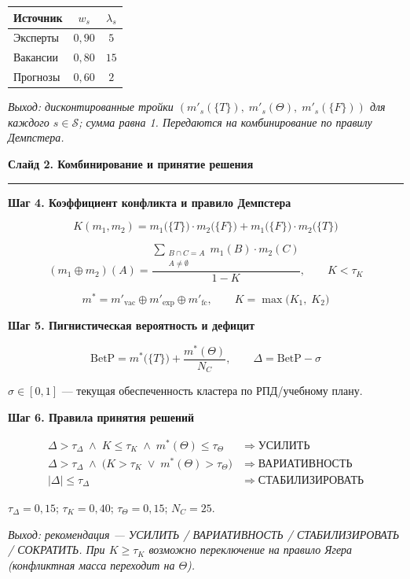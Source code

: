 \documentclass[12pt,a4paper]{article}
\begin{document}
\smallskip
\begin{center}
\begin{tabular}{lcc}
\toprule
Источник & $w_s$ & $\lambda_s$ \\
\midrule
Эксперты & $0{,}90$ & $5$ \\
Вакансии & $0{,}80$ & $15$ \\
Прогнозы & $0{,}60$ & $2$ \\
\bottomrule
\end{tabular}
\end{center}

\medskip
\noindent\textit{Выход: дисконтированные тройки
$(m'_s(\{T\}),\; m'_s(\Theta),\; m'_s(\{F\}))$
для каждого $s \in \mathcal{S}$; сумма равна 1.
Передаются на комбинирование по правилу Демпстера.}

\newpage
\begin{center}
{\large\bfseries Слайд 2. Комбинирование и принятие решения}
\end{center}
\medskip
\hrule
\bigskip

\noindent\textbf{Шаг 4. Коэффициент конфликта и правило Демпстера}

\[
  K(m_1, m_2) =
    m_1\!\bigl(\{T\}\bigr) \cdot m_2\!\bigl(\{F\}\bigr)
    + m_1\!\bigl(\{F\}\bigr) \cdot m_2\!\bigl(\{T\}\bigr)
\]

\[
  (m_1 \oplus m_2)(A) =
  \frac{\displaystyle
    \sum_{\substack{B \cap C = A \\ A \neq \emptyset}}
      m_1(B) \cdot m_2(C)}{1 - K},
  \qquad K < \tau_K
\]

\[
  m^* = m'_{\mathrm{vac}} \oplus m'_{\mathrm{exp}} \oplus m'_{\mathrm{fc}},
  \qquad
  K = \max\!\bigl(K_1,\; K_2\bigr)
\]

\bigskip
\noindent\textbf{Шаг 5. Пигнистическая вероятность и дефицит}

\[
  \mathrm{BetP} = m^*\!\bigl(\{T\}\bigr) + \frac{m^*(\Theta)}{N_C},
  \qquad
  \Delta = \mathrm{BetP} - \sigma
\]

\noindent
$\sigma \in [0,1]$ --- текущая обеспеченность кластера по РПД/учебному плану.

\bigskip
\noindent\textbf{Шаг 6. Правила принятия решений}

\begin{align*}
  \Delta > \tau_\Delta
    \;\wedge\; K \le \tau_K
    \;\wedge\; m^*(\Theta) \le \tau_\Theta
  &\;\Longrightarrow\; \textbf{УСИЛИТЬ}\\[6pt]
  \Delta > \tau_\Delta
    \;\wedge\; \bigl(K > \tau_K
                     \;\vee\; m^*(\Theta) > \tau_\Theta\bigr)
  &\;\Longrightarrow\; \textbf{ВАРИАТИВНОСТЬ}\\[6pt]
  |\Delta| \le \tau_\Delta
  &\;\Longrightarrow\; \textbf{СТАБИЛИЗИРОВАТЬ}
\end{align*}

\smallskip
\noindent
$\tau_\Delta = 0{,}15$;\quad
$\tau_K = 0{,}40$;\quad
$\tau_\Theta = 0{,}15$;\quad
$N_C = 25$.

\medskip
\noindent\textit{Выход: рекомендация — УСИЛИТЬ / ВАРИАТИВНОСТЬ /
СТАБИЛИЗИРОВАТЬ / СОКРАТИТЬ.
При $K \ge \tau_K$ возможно переключение на правило Ягера
(конфликтная масса переходит на $\Theta$).}
\end{document}
